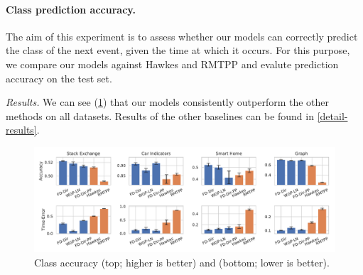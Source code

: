\vspace{3mm}
\paragraph{Class prediction accuracy.} The aim of this experiment is to assess whether our models can correctly predict the class of the next event, given the time at which it occurs. For this purpose, we compare our models against Hawkes and RMTPP and evalute prediction accuracy on the test set.

\textit{Results.} We can see (\cref{fig:accuracy}) that our models consistently outperform the other methods on all datasets. Results of the other baselines can be found in \cref{detail-results}.


\begin{figure}
\centering
    \includegraphics[width=\linewidth]{sections/010_neurips2019/paper/images/accuracy-final.pdf}
    \vspace*{-0.7cm}
    \caption{Class accuracy (top; higher is better) and \TimeScore (bottom; lower is better).}
    \label{fig:accuracy}
    \vspace*{-0.3cm}
\end{figure}
